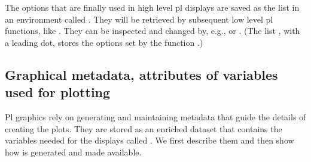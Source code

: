 \documentclass[11pt]{article}\usepackage[]{graphicx}\usepackage[]{color}
\begin{document}
The options that are finally used in high level pl displays are saved 
as the list  in an environment called .
They will be retrieved by subsequent low level pl functions,
like .
They can be inspected and changed by, e.g.,
 or .
(The list , with a leading dot, stores the options set by
the function .)


\subsection{Graphical metadata, attributes of variables used for plotting}
\label{plproperties}
Pl graphics rely on generating and maintaining metadata that guide the
details of creating the plots. 
They are stored as an enriched dataset that contains the variables needed
for the displays called . We first describe them and then show
how  is generated and made available.
\end{document}
